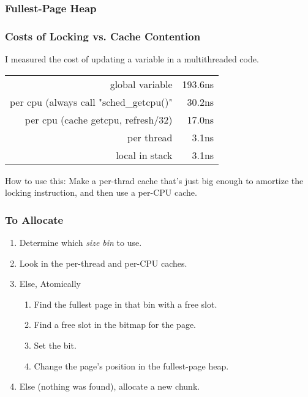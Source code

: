 \documentclass[xcolor=dvipsnames,14pt]{beamer}
\begin{document}
\begin{frame}
\frametitle{Fullest-Page Heap}

\end{frame}



\begin{frame}[fragile]
\frametitle{Costs of Locking vs. Cache Contention}

I measured the cost of updating a variable in a multithreaded code.

\begin{tabular}{rr}
                                                  global variable &    193.6ns \\
            per cpu (always call "sched_getcpu()"  &     30.2ns \\
per cpu (cache getcpu, refresh/32) &     17.0ns \\
                                                      per thread &      3.1ns \\
                                                  local in stack &      3.1ns \\
\end{tabular}

How to use this:  Make a per-thrad cache that's just big enough to amortize the locking instruction, and then use a per-CPU cache.
\end{frame}

\begin{frame}
\frametitle{To Allocate}


\begin{enumerate}
\item Determine which \textit{size bin} to use.
\item Look in the per-thread and per-CPU caches.
\item Else, Atomically 
  \begin{enumerate}
  \item Find the fullest page in that bin with a free slot.
  \item Find a free slot in the bitmap for the page.
  \item Set the bit.
  \item Change the page's position in the fullest-page heap.
  \end{enumerate}
\item Else (nothing was found), allocate a new chunk.
\end{enumerate}
\end{frame}
\end{document}

